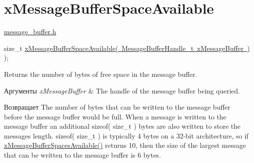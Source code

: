 \hypertarget{group__x_message_buffer_space_available}{}\section{x\+Message\+Buffer\+Space\+Available}
\label{group__x_message_buffer_space_available}
\mbox{\hyperlink{message__buffer_8h}{message\+\_\+buffer.\+h}} 
\begin{DoxyPre}
size\_t \mbox{\hyperlink{message__buffer_8h_a9f1e75a283ef603e914e10ae354e5ab8}{xMessageBufferSpaceAvailable( MessageBufferHandle\_t xMessageBuffer )}} );
\end{DoxyPre}
 Returns the number of bytes of free space in the message buffer.


\begin{DoxyParams}{Аргументы}
{\em x\+Message\+Buffer} & The handle of the message buffer being queried.\\
\hline
\end{DoxyParams}
\begin{DoxyReturn}{Возвращает}
The number of bytes that can be written to the message buffer before the message buffer would be full. When a message is written to the message buffer an additional sizeof( size\+\_\+t ) bytes are also written to store the message\textquotesingle{}s length. sizeof( size\+\_\+t ) is typically 4 bytes on a 32-\/bit architecture, so if \mbox{\hyperlink{message__buffer_8h_a572622608a32242b1d7a922b71f96658}{x\+Message\+Buffer\+Spaces\+Available()}} returns 10, then the size of the largest message that can be written to the message buffer is 6 bytes. 
\end{DoxyReturn}
